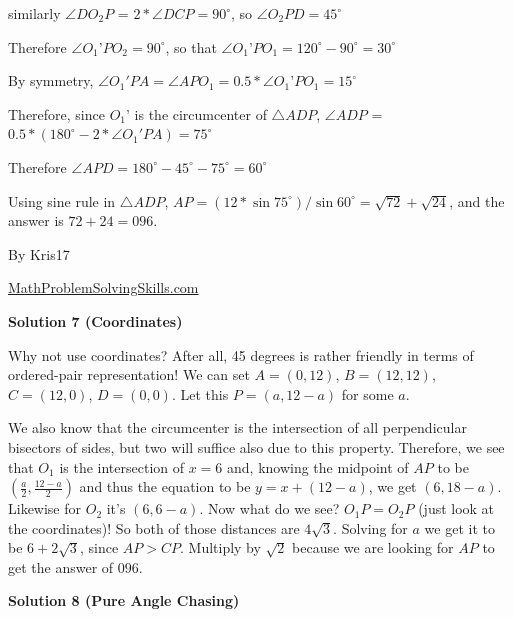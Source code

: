 \begin{enumerate}
 similarly $\angle{DO_2P}$ = $2*\angle{DCP} = 90^\circ$, so $\angle{O_2PD}=45^\circ$

 Therefore $\angle{O_1’PO_2}=90^\circ$, so that $\angle{O_1’PO_1} =120^\circ - 90^\circ = 30^\circ$

 By symmetry, $\angle{O_1'PA} = \angle{APO_1} = 0.5*\angle{O_1’PO_1} = 15^\circ$

 Therefore, since $O_1’$ is the circumcenter of $\triangle{ADP}$, $\angle{ADP}$ = $0.5*(180^\circ - 2*\angle{O_1'PA}) = 75^\circ$

 Therefore $\angle{APD} = 180^\circ - 45^\circ - 75^\circ = 60^\circ$

 Using sine rule in $\triangle{ADP}$, $AP = (12 * \sin 75^\circ) / \sin 60^\circ =\sqrt{72}+\sqrt{24}$, and the answer is $72+24=\boxed{096}.$

 By Kris17

 


 \href{https://mathproblemsolvingskills.wordpress.com/}{MathProblemSolvingSkills.com}

 


 



\textbf{Solution 7 (Coordinates)}

Why not use coordinates? After all, 45 degrees is rather friendly in terms of ordered-pair representation! We can set $A=(0, 12)$, $B=(12,12)$, $C=(12, 0)$, $D=(0, 0)$. Let this $P=(a, 12-a)$ for some $a$. 

 We also know that the circumcenter is the intersection of all perpendicular bisectors of sides, but two will suffice also due to this property. Therefore, we see that $O_{1}$ is the intersection of $x=6$ and, knowing the midpoint of $AP$ to be $(\frac{a}{2}, \frac{12-a}{2})$ and thus the equation to be $y=x+(12-a)$, we get $(6, 18-a)$. Likewise for $O_{2}$ it's $(6, 6-a)$. Now what do we see? $O_{1}P=O_{2}P$ (just look at the coordinates)! So both of those distances are $4\sqrt{3}$. Solving for $a$ we get it to be $6+2\sqrt{3}$, since $AP>CP$. Multiply by $\sqrt{2}$ because we are looking for $AP$ to get the answer of $\boxed{096}$.

 



\textbf{Solution 8 (Pure Angle Chasing)}


\end{enumerate}
